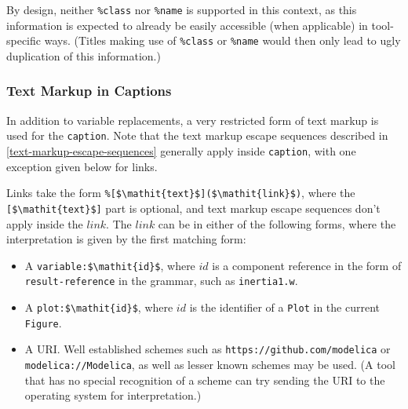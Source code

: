 \begin{nonnormative}
By design, neither \lstinline!%class! nor \lstinline!%name! is supported in this context, as this information is expected to already be easily accessible (when applicable) in tool-specific ways.  (Titles making use of \lstinline!%class! or \lstinline!%name! would then only lead to ugly duplication of this information.)
\end{nonnormative}

\subsubsection{Text Markup in Captions}\label{text-markup-in-captions}

In addition to variable replacements, a very restricted form of text markup is used for the \lstinline!caption!.  Note that the text markup escape sequences described in \cref{text-markup-escape-sequences} generally apply inside \lstinline!caption!, with one exception given below for links.

Links take the form \lstinline!%[$\mathit{text}$]($\mathit{link}$)!, where the \lstinline![$\mathit{text}$]! part is optional, and text markup escape sequences don't apply inside the $\mathit{link}$.  The $\mathit{link}$ can be in either of the following forms, where the interpretation is given by the first matching form:
\begin{itemize}
\item
A \lstinline!variable:$\mathit{id}$!, where $\mathit{id}$ is a component reference in the form of \lstinline[language=grammar]!result-reference! in the grammar, such as \lstinline!inertia1.w!.
\item
A \lstinline!plot:$\mathit{id}$!, where $\mathit{id}$ is the identifier of a \lstinline!Plot! in the current \lstinline!Figure!.
\item
A URI.
Well established schemes such as \lstinline[language={[nocomment]modelica}]!https://github.com/modelica! or \lstinline[language={[nocomment]modelica}]!modelica://Modelica!, as well as lesser known schemes may be used.
(A tool that has no special recognition of a scheme can try sending the URI to the operating system for interpretation.)
\end{itemize}

